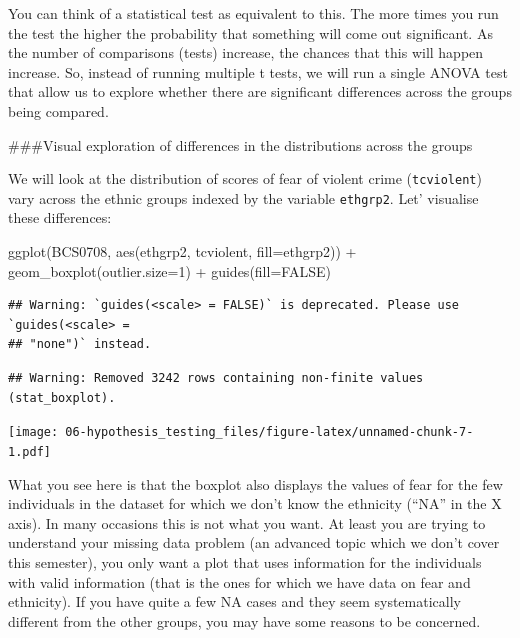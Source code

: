 \documentclass[
]{book}
\newenvironment{Shaded}{\begin{snugshade}}{\end{snugshade}}
\newcommand{\AttributeTok}[1]{\textcolor[rgb]{0.77,0.63,0.00}{#1}}
\newcommand{\ConstantTok}[1]{\textcolor[rgb]{0.00,0.00,0.00}{#1}}
\newcommand{\DecValTok}[1]{\textcolor[rgb]{0.00,0.00,0.81}{#1}}
\newcommand{\FunctionTok}[1]{\textcolor[rgb]{0.00,0.00,0.00}{#1}}
\newcommand{\NormalTok}[1]{#1}
\newcommand{\SpecialCharTok}[1]{\textcolor[rgb]{0.00,0.00,0.00}{#1}}
\begin{document}
You can think of a statistical test as equivalent to this. The more times you run the test the higher the probability that something will come out significant. As the number of comparisons (tests) increase, the chances that this will happen increase. So, instead of running multiple t tests, we will run a single ANOVA test that allow us to explore whether there are significant differences across the groups being compared.

\#\#\#Visual exploration of differences in the distributions across the groups

We will look at the distribution of scores of fear of violent crime (\texttt{tcviolent}) vary across the ethnic groups indexed by the variable \texttt{ethgrp2}. Let' visualise these differences:

\begin{Shaded}
\begin{Highlighting}[]
\FunctionTok{ggplot}\NormalTok{(BCS0708, }\FunctionTok{aes}\NormalTok{(ethgrp2, tcviolent, }\AttributeTok{fill=}\NormalTok{ethgrp2)) }\SpecialCharTok{+} 
  \FunctionTok{geom\_boxplot}\NormalTok{(}\AttributeTok{outlier.size=}\DecValTok{1}\NormalTok{) }\SpecialCharTok{+} 
  \FunctionTok{guides}\NormalTok{(}\AttributeTok{fill=}\ConstantTok{FALSE}\NormalTok{) }
\end{Highlighting}
\end{Shaded}

\begin{verbatim}
## Warning: `guides(<scale> = FALSE)` is deprecated. Please use `guides(<scale> =
## "none")` instead.
\end{verbatim}

\begin{verbatim}
## Warning: Removed 3242 rows containing non-finite values (stat_boxplot).
\end{verbatim}

\texttt{[image: 06-hypothesis\_testing\_files/figure-latex/unnamed-chunk-7-1.pdf]}

What you see here is that the boxplot also displays the values of fear for the few individuals in the dataset for which we don't know the ethnicity (``NA'' in the X axis). In many occasions this is not what you want. At least you are trying to understand your missing data problem (an advanced topic which we don't cover this semester), you only want a plot that uses information for the individuals with valid information (that is the ones for which we have data on fear and ethnicity). If you have quite a few NA cases and they seem systematically different from the other groups, you may have some reasons to be concerned.
\end{document}
